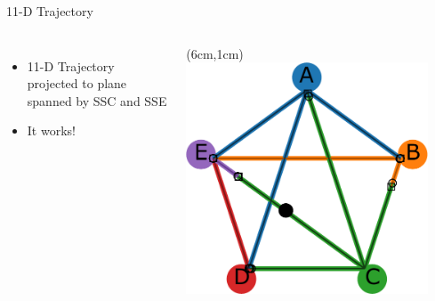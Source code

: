 \documentclass[15pt]{beamer}
\begin{document}
\begin{frame}{11-D Trajectory}
\begin{columns}
\begin{itemize}
	\item 11-D Trajectory projected to plane spanned by SSC and SSE 
	\item It works!
\end{itemize}

	\begin{textblock*}{7cm}(6cm,1cm) %
	 \includegraphics[width=0.9\textwidth]{attractor_network_v3_w_dot}
	\end{textblock*}
\end{columns}
\end{frame}
\end{document}
